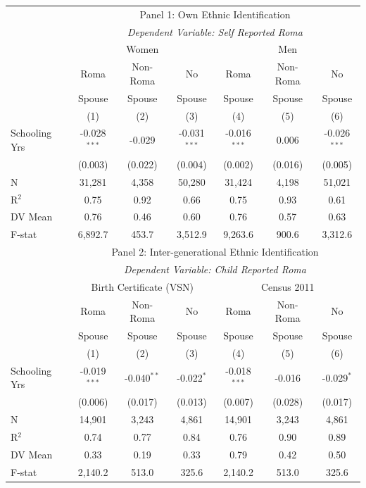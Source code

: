 \begin{tabular}{lccc@{\hspace{2em}}ccc}
\toprule
& \multicolumn{6}{c}{Panel 1: Own Ethnic Identification} \\
& \multicolumn{6}{c}{\textit{Dependent Variable: Self Reported Roma}} \\
& \multicolumn{3}{c}{Women} & \multicolumn{3}{c}{Men} \\
& Roma   &  Non-Roma & No      & Roma   &  Non-Roma & No  \\
& Spouse & Spouse & Spouse   & Spouse & Spouse & Spouse \\
& (1) & (2) & (3) & (4) & (5) & (6) \\
\midrule
Schooling Yrs & -0.028$^{***}$ & -0.029 & -0.031$^{***}$ & -0.016$^{***}$ & 0.006 & -0.026$^{***}$ \\
& (0.003) & (0.022) & (0.004) & (0.002) & (0.016) & (0.005) \\
\midrule
N & 31,281 & 4,358 & 50,280 & 31,424 & 4,198 & 51,021 \\
R$^2$ & 0.75 & 0.92 & 0.66 & 0.75 & 0.93 & 0.61 \\
DV Mean & 0.76 & 0.46 & 0.60 & 0.76 & 0.57 & 0.63 \\
F-stat & 6,892.7 & 453.7 & 3,512.9 & 9,263.6 & 900.6 & 3,312.6 \\
\addlinespace \midrule
& \multicolumn{6}{c}{Panel 2: Inter-generational Ethnic Identification} \\
& \multicolumn{6}{c}{\textit{Dependent Variable: Child Reported Roma}} \\
& \multicolumn{3}{c}{Birth Certificate (VSN)} & \multicolumn{3}{c}{Census 2011} \\
& Roma   &  Non-Roma & No      & Roma   &  Non-Roma & No  \\
& Spouse & Spouse & Spouse   & Spouse & Spouse & Spouse \\
& (1) & (2) & (3) & (4) & (5) & (6) \\
\midrule
Schooling Yrs & -0.019$^{***}$ & -0.040$^{**}$ & -0.022$^{*}$ & -0.018$^{***}$ & -0.016 & -0.029$^{*}$ \\
& (0.006) & (0.017) & (0.013) & (0.007) & (0.028) & (0.017) \\
\midrule
N & 14,901 & 3,243 & 4,861 & 14,901 & 3,243 & 4,861 \\
R$^2$ & 0.74 & 0.77 & 0.84 & 0.76 & 0.90 & 0.89 \\
DV Mean & 0.33 & 0.19 & 0.33 & 0.79 & 0.42 & 0.50 \\
F-stat & 2,140.2 & 513.0 & 325.6 & 2,140.2 & 513.0 & 325.6 \\
\bottomrule
\end{tabular}
